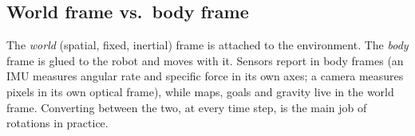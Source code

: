 \subsection{World frame vs.\ body frame}\label{sec:rot:world-frame-body}
The \emph{world} (spatial, fixed, inertial) frame is attached to the environment. The \emph{body} frame is glued to the robot and moves with it. Sensors report in body frames (an IMU measures angular rate and specific force in its own axes; a camera measures pixels in its own optical frame), while maps, goals and gravity live in the world frame. Converting between the two, at every time step, is the main job of rotations in practice.
